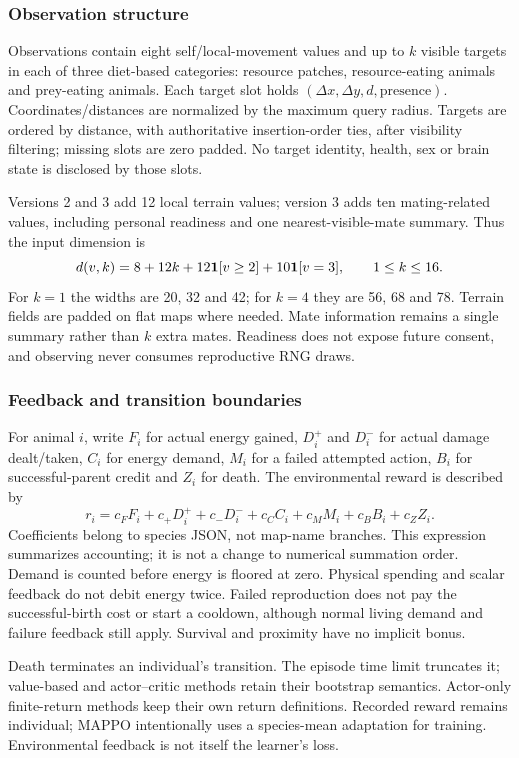 \subsubsection{Observation structure}
Observations contain eight self/local-movement values and up to $k$ visible
targets in each of three diet-based categories: resource patches,
resource-eating animals and prey-eating animals. Each target slot holds
$(\Delta x,\Delta y,d,\text{presence})$. Coordinates/distances are normalized by
the maximum query radius. Targets are ordered by distance, with authoritative
insertion-order ties, after visibility filtering; missing slots are zero padded.
No target identity, health, sex or brain state is disclosed by those slots.

Versions 2 and 3 add 12 local terrain values; version 3 adds ten mating-related
values, including personal readiness and one nearest-visible-mate summary.
Thus the input dimension is
\begin{equation}\label{eq:obswidth}
 d(v,k)=8+12k+12\mathbf{1}[v\geq2]+10\mathbf{1}[v=3],\qquad 1\leq k\leq16.
\end{equation}
For $k=1$ the widths are 20, 32 and 42; for $k=4$ they are 56, 68 and 78.
Terrain fields are padded on flat maps where needed. Mate information remains a
single summary rather than $k$ extra mates. Readiness does not expose future
consent, and observing never consumes reproductive RNG draws.

\subsubsection{Feedback and transition boundaries}
For animal $i$, write $F_i$ for actual energy gained, $D_i^+$ and $D_i^-$ for
actual damage dealt/taken, $C_i$ for energy demand, $M_i$ for a failed attempted
action, $B_i$ for successful-parent credit and $Z_i$ for death. The environmental
reward is described by
\begin{equation}\label{eq:reward}
 r_i=c_FF_i+c_+D_i^++c_-D_i^-+c_CC_i+c_MM_i+c_BB_i+c_ZZ_i.
\end{equation}
Coefficients belong to species JSON, not map-name branches. This expression
summarizes accounting; it is not a change to numerical summation order. Demand
is counted before energy is floored at zero. Physical spending and scalar
feedback do not debit energy twice. Failed reproduction does not pay the
successful-birth cost or start a cooldown, although normal living demand and
failure feedback still apply. Survival and proximity have no implicit bonus.

Death terminates an individual's transition. The episode time limit truncates
it; value-based and actor--critic methods retain their bootstrap semantics.
Actor-only finite-return methods keep their own return definitions. Recorded
reward remains individual; MAPPO intentionally uses a species-mean adaptation
for training. Environmental feedback is not itself the learner's loss.

